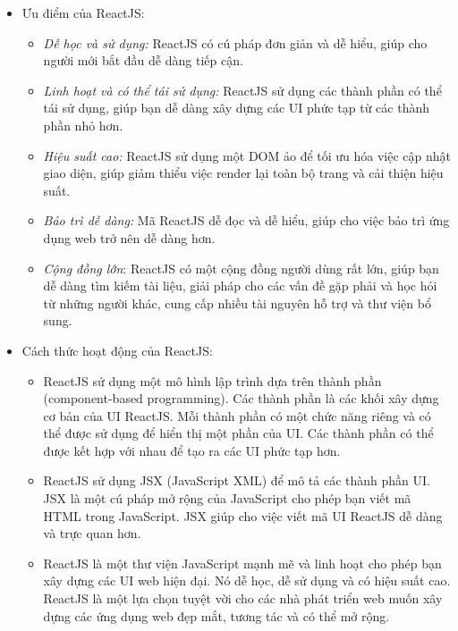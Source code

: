 \begin{itemize}
    \item Ưu điểm của ReactJS:
        \begin{itemize}
            \item \textit{Dễ học và sử dụng:} ReactJS có cú pháp đơn giản và dễ hiểu, giúp cho người mới bắt đầu dễ dàng tiếp cận.
            \item \textit{Linh hoạt và có thể tái sử dụng:} ReactJS sử dụng các thành phần có thể tái sử dụng, giúp bạn dễ dàng xây dựng các UI phức tạp từ các thành phần nhỏ hơn.
            \item \textit{Hiệu suất cao:} ReactJS sử dụng một DOM ảo để tối ưu hóa việc cập nhật giao diện, giúp giảm thiểu việc render lại toàn bộ trang và cải thiện hiệu suất.
            \item \textit{Bảo trì dễ dàng:} Mã ReactJS dễ đọc và dễ hiểu, giúp cho việc bảo trì ứng dụng web trở nên dễ dàng hơn.
            \item \textit{Cộng đồng lớn}: ReactJS có một cộng đồng người dùng rất lớn, giúp bạn dễ dàng tìm kiếm tài liệu, giải pháp cho các vấn đề gặp phải và học hỏi từ những người khác, cung cấp nhiều tài nguyên hỗ trợ và thư viện bổ sung.
        \end{itemize}
    \item Cách thức hoạt động của ReactJS:
        \begin{itemize}
            \item ReactJS sử dụng một mô hình lập trình dựa trên thành phần (component-based programming). Các thành phần là các khối xây dựng cơ bản của UI ReactJS. Mỗi thành phần có một chức năng riêng và có thể được sử dụng để hiển thị một phần của UI. Các thành phần có thể được kết hợp với nhau để tạo ra các UI phức tạp hơn.
            \item ReactJS sử dụng JSX (JavaScript XML) để mô tả các thành phần UI. JSX là một cú pháp mở rộng của JavaScript cho phép bạn viết mã HTML trong JavaScript. JSX giúp cho việc viết mã UI ReactJS dễ dàng và trực quan hơn.
            \item ReactJS là một thư viện JavaScript mạnh mẽ và linh hoạt cho phép bạn xây dựng các UI web hiện đại. Nó dễ học, dễ sử dụng và có hiệu suất cao. ReactJS là một lựa chọn tuyệt vời cho các nhà phát triển web muốn xây dựng các ứng dụng web đẹp mắt, tương tác và có thể mở rộng.
        \end{itemize}
\end{itemize}

